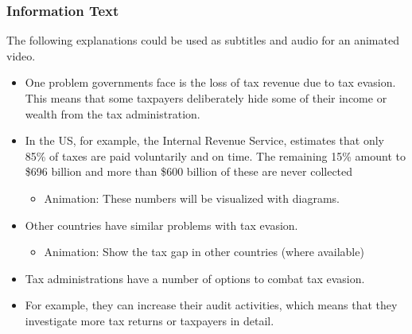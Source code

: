 \documentclass[11pt]{article}
\begin{document}
\subsubsection*{Information Text}
The following explanations could be used as subtitles and audio for an animated video.
\begin{itemize}
\item One problem governments face is the loss of tax revenue due to tax evasion. This means that some taxpayers deliberately hide some of their income or wealth from the tax administration. 
\item In the US, for example, the Internal Revenue Service, estimates that only 85\% of taxes are paid voluntarily and on time. The remaining 15\% amount to \$696 billion and more than \$600 billion of these are never collected
\begin{itemize}
    \item Animation: These numbers will be visualized with diagrams.
\end{itemize}
\item Other countries have similar problems with tax evasion.
\begin{itemize}
    \item Animation: Show the tax gap in other countries (where available)
\end{itemize}
\item Tax administrations have a number of options to combat tax evasion.
\item For example, they can increase their audit activities, which means that they investigate more tax returns or taxpayers in detail.  

\end{itemize}
\end{document}
